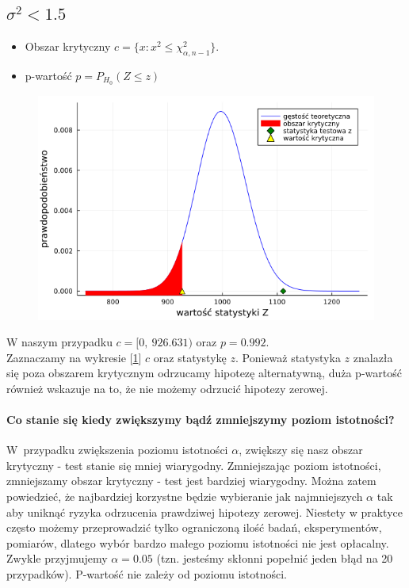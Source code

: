 \documentclass{article}
\theoremstyle{break}
\begin{document}
\subsection*{$\sigma^2  < 1.5$}
\begin{itemize}
	\item Obszar krytyczny $c=\{x: x^2\leq \chi^2_{\alpha,n-1}\}$.
	\item p-wartość $p=P_{H_0}(Z\leq z)$
\end{itemize}
\begin{figure}[H]
	\begin{center}
		\includegraphics[scale=0.5]{Z2.3.png}
		\caption{}
		\label{fig:6}
	\end{center}
\end{figure}
W naszym przypadku $c=[0,~926.631)$ oraz $p=0.992$.\\
Zaznaczamy na wykresie [\ref{fig:6}]  $c$ oraz statystykę $z$. Ponieważ statystyka $z$ znalazła się poza obszarem krytycznym odrzucamy hipotezę alternatywną, duża p-wartość również wskazuje na to, że nie możemy odrzucić hipotezy zerowej.\\ 

\paragraph{Co stanie się kiedy zwiększymy bądź zmniejszymy poziom istotności?} 
W~przypadku zwiększenia poziomu istotności $\alpha$, zwiększy się nasz obszar krytyczny - test stanie się mniej wiarygodny. Zmniejszając poziom istotności, zmniejszamy obszar krytyczny - test jest bardziej wiarygodny. Można zatem powiedzieć, że najbardziej korzystne będzie wybieranie jak najmniejszych $\alpha$ tak aby uniknąć ryzyka odrzucenia prawdziwej hipotezy zerowej. Niestety w praktyce często możemy przeprowadzić tylko ograniczoną ilość badań, eksperymentów, pomiarów, dlatego wybór bardzo małego poziomu istotności nie jest opłacalny. Zwykle przyjmujemy $\alpha=0.05$ (tzn. jesteśmy skłonni popełnić jeden błąd na 20 przypadków). P-wartość nie zależy od poziomu istotności.
\end{document}

